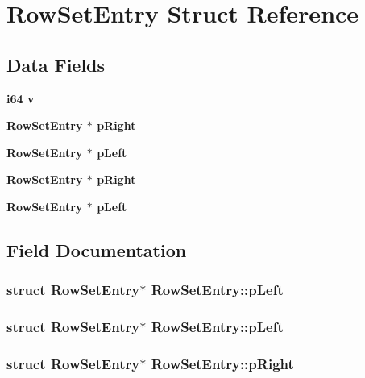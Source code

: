 \section{Row\-Set\-Entry Struct Reference}
\label{structRowSetEntry}
\subsection*{Data Fields}
\begin{CompactItemize}
\item 
\bf{i64} \bf{v}
\item 
\bf{Row\-Set\-Entry} $\ast$ \bf{p\-Right}
\item 
\bf{Row\-Set\-Entry} $\ast$ \bf{p\-Left}
\item 
\bf{Row\-Set\-Entry} $\ast$ \bf{p\-Right}
\item 
\bf{Row\-Set\-Entry} $\ast$ \bf{p\-Left}
\end{CompactItemize}


\subsection{Field Documentation}
\subsubsection{\setlength{\rightskip}{0pt plus 5cm}struct \bf{Row\-Set\-Entry}$\ast$ \bf{Row\-Set\-Entry::p\-Left}}\label{structRowSetEntry_b1b94e067a0aa85961f919233e67229b}


\subsubsection{\setlength{\rightskip}{0pt plus 5cm}struct \bf{Row\-Set\-Entry}$\ast$ \bf{Row\-Set\-Entry::p\-Left}}\label{structRowSetEntry_b1b94e067a0aa85961f919233e67229b}


\subsubsection{\setlength{\rightskip}{0pt plus 5cm}struct \bf{Row\-Set\-Entry}$\ast$ \bf{Row\-Set\-Entry::p\-Right}}\label{structRowSetEntry_0a6f0a5d3bf556983fcd55457b58f1c1}


